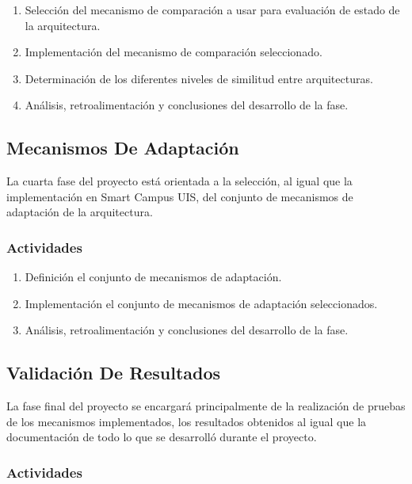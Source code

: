 \documentclass[12pt]{article}
\begin{document}
    \begin{enumerate}[label=\thesubsection.\arabic*., wide, labelindent=2em, leftmargin=5em]
        \item Selección del mecanismo de comparación a usar para evaluación de estado de la arquitectura.
        \item Implementación del mecanismo de comparación seleccionado.
        \item Determinación de los diferentes niveles de similitud entre arquitecturas.
        \item Análisis, retroalimentación y conclusiones del desarrollo de la fase. 
    \end{enumerate}    

    \subsection{Mecanismos De Adaptación}
    
    La cuarta fase del proyecto está orientada a la selección, al igual que la implementación en Smart Campus UIS, del conjunto de mecanismos de adaptación de la arquitectura. 

    \subsubsection*{Actividades}

   \begin{enumerate}[label=\thesubsection.\arabic*., wide, labelindent=2em, leftmargin=5em]
        \item Definición el conjunto de mecanismos de adaptación.
        \item Implementación el conjunto de mecanismos de adaptación seleccionados.
        \item Análisis, retroalimentación y conclusiones del desarrollo de la fase. 
    \end{enumerate}  
    
    \subsection{Validación De Resultados}
    
    La fase final del proyecto se encargará principalmente de la realización de pruebas de los mecanismos implementados, los resultados obtenidos al igual que la documentación de todo lo que se desarrolló durante el proyecto.
    
    \subsubsection*{Actividades}
    
\end{document}

